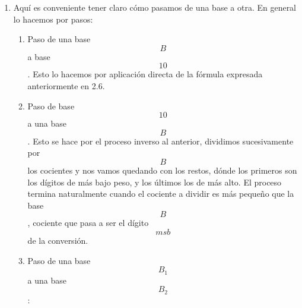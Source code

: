 \documentclass[
]{article}
\begin{document}
\begin{enumerate}
\begin{enumerate}
    \[r \in {d_{i \neq 0} \cdot {\lbrack\mathbf{D}_{\mathbf{\mathrm{n}}}\rbrack}^{\ast}}\]
    será
    \[\nu{(r)}{=}{\sum\limits_{\iota = 0}^{l{{(r)} - 1}}{({\nu{{(d_{\mathbf{\mathrm{\iota}}})} \cdot {(n^{\mathbf{\mathrm{\iota}}})}}})}}\],
    y \[l{(r)}\] es la longitud de la representación \[r\]. Este tipo de
    representación es la más usada en el ámbito de los números desde
    hace seiscientos o setecientos años más o menos en Occidente, sólo
    que para base 10 (diez dígitos distintos). Nosotros usaremos también
    bastante la base 2, código que llamamos habitualmente binario
    natural.
  \item
    Aquí es conveniente tener claro cómo pasamos de una base a otra. En
    general lo ha\-cemos por pasos:

    \begin{enumerate}
    \def\labelenumiii{\arabic{enumiii}.}
    \item
      Paso de una base \[B\] a base \[10\]. Esto lo hacemos por
      aplicación directa de la fórmula expresada anteriormente en 2.6.
    \item
      Paso de base \[10\] a una base \[B\]. Esto se hace por el proceso
      inverso al ante\-rior, dividimos sucesivamente por \[B\]los
      cocientes y nos vamos quedando con los restos, dónde los primeros
      son los dígitos de más bajo peso, y los últimos los de más alto.
      El proceso termina naturalmente cuando el cociente a dividir es
      más pequeño que la base \[B\], cociente que pasa a ser el dígito
      \[\mathbf{\mathit{msb}}\]de la conver\-sión.
    \item
      Paso de una base \[B_{1}\] a una base \[B_{2}\]:


\end{enumerate}
\end{enumerate}
\end{enumerate}
\end{document}
